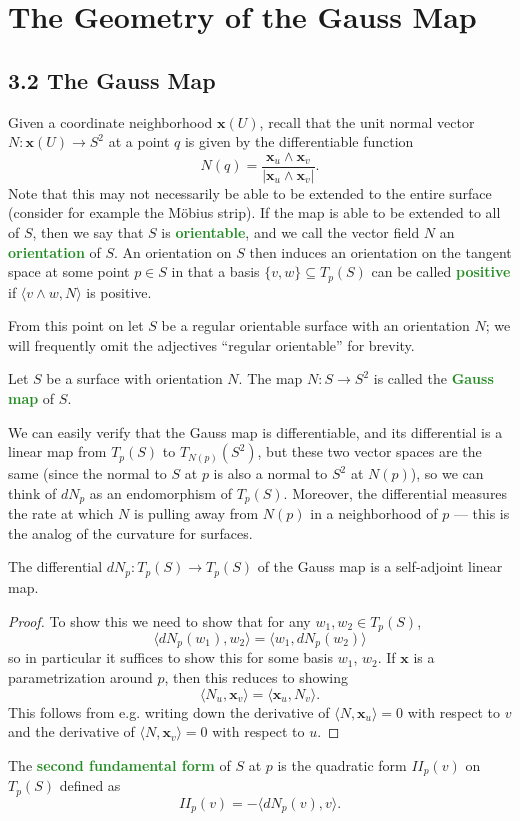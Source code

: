 \documentclass[10pt]{scrartcl}
\providecommand{\mb}[1]{\mathbf{#1}}
\providecommand{\vocab}[1]{{\textbf{\textcolor{ForestGreen}{#1}}}}
\begin{document}
\section{The Geometry of the Gauss Map}
\subsection{3.2 The Gauss Map}
Given a coordinate neighborhood $\mb x(U)$, recall that
the unit normal vector $N\colon \mb x(U)\to S^2$ at a point $q$ is given by
the differentiable function
\[N(q) = \frac{\mb x_u\wedge \mb x_v}{|\mb x_u\wedge\mb x_v|}.\]
Note that this may not necessarily be able to be extended to the entire surface
(consider for example the M\"obius strip).
If the map is able to be extended to all of $S$, then we say that
$S$ is \vocab{orientable}, and we call the vector field $N$
an \vocab{orientation} of $S$.
An orientation on $S$ then induces an orientation on the tangent space
at some point $p\in S$ in that a basis $\{v,w\}\subseteq T_p(S)$
can be called \vocab{positive} if $\langle v\wedge w,N\rangle$ is positive.

From this point on let $S$ be a regular orientable surface
with an orientation $N$; we will frequently omit
the adjectives ``regular orientable'' for brevity.

\begin{definition}
	Let $S$ be a surface with orientation $N$.
	The map $N\colon S\to S^2$ is called the \vocab{Gauss map} of $S$.
\end{definition}

We can easily verify that the Gauss map is differentiable,
and its differential is a linear map from $T_p(S)$ to $T_{N(p)}(S^2)$,
but these two vector spaces are the same (since the normal to $S$ at $p$
is also a normal to $S^2$ at $N(p)$), so we can think of $dN_p$
as an endomorphism of $T_p(S)$.
Moreover, the differential measures the rate
at which $N$ is pulling away from $N(p)$ in a neighborhood of $p$ ---
this is the analog of the curvature for surfaces.

\begin{prop}
	The differential $dN_p\colon T_p(S)\to T_p(S)$ of the Gauss map
	is a self-adjoint linear map.
\end{prop}

\begin{proof}
	To show this we need to show that for any $w_1,w_2\in T_p(S)$,
	\[\langle dN_p(w_1),w_2\rangle = \langle w_1,dN_p(w_2)\rangle\]
	so in particular it suffices to show this for some basis $w_1$, $w_2$.
	If $\mb x$ is a parametrization around $p$, then this reduces to showing
	\[\langle N_u,\mb x_v\rangle = \langle \mb x_u, N_v\rangle.\]
	This follows from e.g. writing down the derivative of
	$\langle N,\mb x_u\rangle = 0$ with respect to $v$ and the derivative of
	$\langle N,\mb x_v\rangle = 0$ with respect to $u$.
\end{proof}

\begin{definition}
	The \vocab{second fundamental form} of $S$ at $p$ is
	the quadratic form $II_p(v)$ on $T_p(S)$ defined as
	\[II_p(v) = -\langle dN_p(v),v\rangle.\]
\end{definition}
\end{document}
